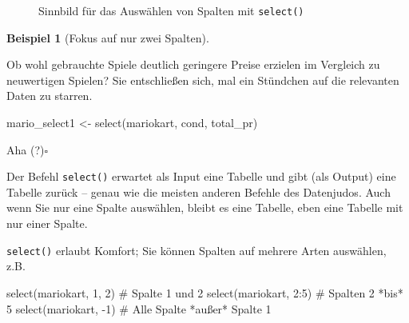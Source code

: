 \documentclass[
  letterpaper,
]{scrbook}
\newenvironment{Shaded}{\begin{snugshade}}{\end{snugshade}}
\newcommand{\CommentTok}[1]{\textcolor[rgb]{0.37,0.37,0.37}{#1}}
\newcommand{\DecValTok}[1]{\textcolor[rgb]{0.68,0.00,0.00}{#1}}
\newcommand{\FunctionTok}[1]{\textcolor[rgb]{0.28,0.35,0.67}{#1}}
\newcommand{\NormalTok}[1]{\textcolor[rgb]{0.00,0.23,0.31}{#1}}
\newcommand{\OtherTok}[1]{\textcolor[rgb]{0.00,0.23,0.31}{#1}}
\newcommand{\SpecialCharTok}[1]{\textcolor[rgb]{0.37,0.37,0.37}{#1}}
\theoremstyle{definition}
\theoremstyle{definition}
\newtheorem{example}{Beispiel}[chapter]
\theoremstyle{definition}
\theoremstyle{remark}
\begin{document}
\begin{figure}


\caption{\label{fig-select}Sinnbild für das Auswählen von Spalten mit
\texttt{select()}}

\end{figure}%

\begin{example}[Fokus auf nur zwei
Spalten]\protect\hypertarget{exm-select}{}\label{exm-select}

Ob wohl gebrauchte Spiele deutlich geringere Preise erzielen im
Vergleich zu neuwertigen Spielen? Sie entschließen sich, mal ein
Stündchen auf die relevanten Daten zu starren.

\begin{Shaded}
\begin{Highlighting}[]
\NormalTok{mario\_select1 }\OtherTok{\textless{}{-}} \FunctionTok{select}\NormalTok{(mariokart, cond, total\_pr)}
\end{Highlighting}
\end{Shaded}

Aha (?)\(\square\)

\end{example}

Der Befehl \texttt{select()} erwartet als Input eine Tabelle und gibt
(als Output) eine Tabelle zurück -- genau wie die meisten anderen
Befehle des Datenjudos. Auch wenn Sie nur eine Spalte auswählen, bleibt
es eine Tabelle, eben eine Tabelle mit nur einer Spalte.

\texttt{select()} erlaubt Komfort; Sie können Spalten auf mehrere Arten
auswählen, z.B.

\begin{Shaded}
\begin{Highlighting}[]
\FunctionTok{select}\NormalTok{(mariokart, }\DecValTok{1}\NormalTok{, }\DecValTok{2}\NormalTok{)  }\CommentTok{\# Spalte 1 und 2}
\FunctionTok{select}\NormalTok{(mariokart, }\DecValTok{2}\SpecialCharTok{:}\DecValTok{5}\NormalTok{)  }\CommentTok{\#  Spalten 2 *bis* 5 }
\FunctionTok{select}\NormalTok{(mariokart, }\SpecialCharTok{{-}}\DecValTok{1}\NormalTok{)  }\CommentTok{\# Alle Spalte *außer* Spalte 1}
\end{Highlighting}
\end{Shaded}
\end{document}
